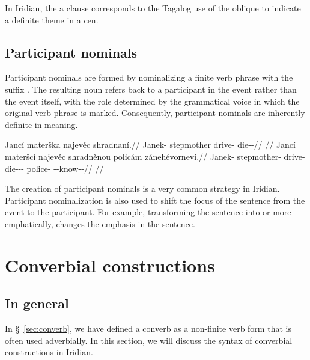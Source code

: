 In Iridian, the a  clause corresponds to the Tagalog use
of the oblique to indicate a definite theme in a {\sc cen}. 




\subsection{Participant nominals}

Participant nominals are formed by nominalizing a finite verb phrase with the
suffix . The resulting noun refers back to a participant in the event
rather than the event itself, with the role determined by the grammatical voice
in which the original verb phrase is marked. Consequently, participant nominals
are inherently definite in meaning.

\pex
\a\begingl
    \gla Jancí materška najevěc shradnaní.//
    \glb Janek-\Gen{} stepmother drive-\Cv{} die-\Pv{}-\Ret{}//
    \glft {}//
\endgl
\a\begingl
    \gla Jancí materšcí najevěc shradněnou policám zánehévorneví.//
    \glb Janek-\Gen{} stepmother-\Gen{} drive-\Cv{} die-\Pv{}-\Ret{}-\Nz{} police-\Agt{} \Neg{}-\Caus{}-know-\Pv{}-\Cont{}//
    \glft {}//
\endgl
\xe

The creation of participant nominals is a very common strategy in Iridian.
Participant nominalization is also used to shift the focus of the sentence from
the event to the participant. For example, transforming the sentence  into  or more
emphatically,  changes the emphasis
in the sentence.

\section{Converbial constructions}\label{converbs-syntax}

\subsection{In general}

In \S~\ref{sec:converb}, we have defined a converb as a non-finite verb form
that is often used adverbially. In this section, we will discuss the syntax of
converbial constructions in Iridian.

